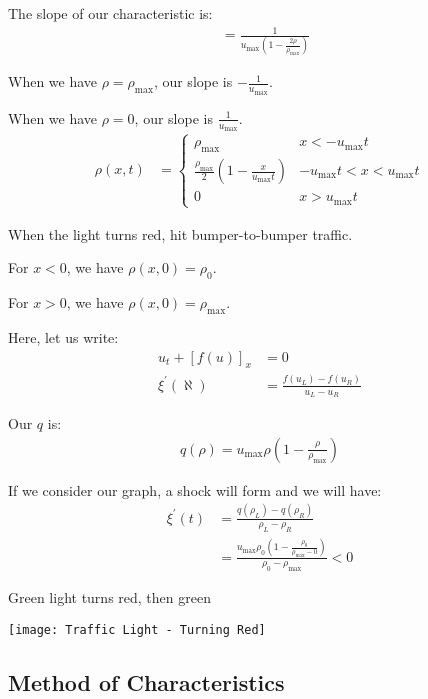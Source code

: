 \documentclass{article}
\begin{document}
The slope of our characteristic is:
%
\begin{align}
  & = \frac{1}{u_{\max} \left(1 - \frac{2 \rho}{\rho_{\max}}\right)}
\end{align}

When we have $\rho = \rho_{\max}$, our slope is $- \frac{1}{u_{\max}}$.

When we have $\rho = 0$, our slope is $\frac{1}{u_{\max}}$.
%
\begin{align}
  \rho(x, t) & =
  \begin{cases}
    \rho_{\max} & x < - u_{\max} t\\
    \frac{\rho_{\max}}{2} \left(1 - \frac{x}{u_{\max}t}\right)
    & -u_{\max} t < x < u_{\max} t\\
    0 & x > u_{\max} t
  \end{cases}
\end{align}

\ex When the light turns red, hit bumper-to-bumper traffic.

For $x < 0$, we have $\rho(x, 0) = \rho_0$.

For $x > 0$, we have $\rho(x, 0) = \rho_{\max}$.

Here, let us write:
%
\begin{align}
  u_t + [f(u)]_x & = 0\\
  \xi^\prime(\aleph) & = \frac{f(u_L) - f(u_R)}{u_L - u_R}
\end{align}

Our $q$ is:
%
\begin{align}
  q(\rho) = u_{\max} \rho\left(1 - \frac{\rho}{\rho_{\max}}\right)
\end{align}

If we consider our graph, a shock will form and we will have:
%
\begin{align}
  \xi^\prime(t) & = \frac{q(\rho_L) - q(\rho_R)}{\rho_L - \rho_R}\\
  & = \frac{u_{\max} \rho_0 \left( 1 - \frac{\rho_0}{\rho_{\max} - 0}\right)}{\rho_0 - \rho_{\max}} < 0
\end{align}


\ex Green light turns red, then green

\begin{center}
  \texttt{[image: Traffic Light - Turning Red]}
\end{center}

\subsection{Method of Characteristics}
\end{document}
